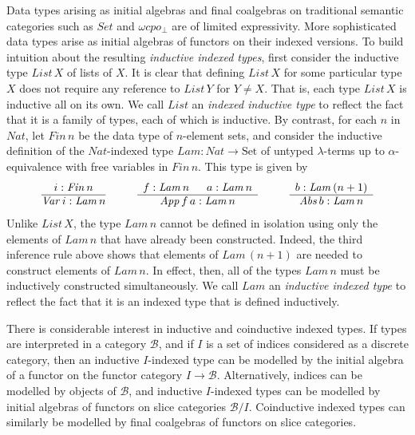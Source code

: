 \documentclass{LMCS}
\makeatletter
\newcommand{\ra}{\rightarrow}
\newcommand{\Set}{\mbox{Set}}
\newcommand{\proofrule}[2]{\ensuremath{
  \begin{array}[t]{@{}c@{}}
    \begin{array}[t]{lllll} 
      #1
    \end{array}\\
  \hline 
     #2
  \end{array}}}
\newcommand\B{{\mathcal B}}
\newcommand\Lam{\mathit{Lam}}
\newcommand\Fin{\mathit{Fin}}
\newcommand\Nat{\mathit{Nat}}
\theoremstyle{plain}
\theoremstyle{remark}
\theoremstyle{definition}
\makeatother
\begin{document}
Data types arising as initial algebras and final coalgebras on
traditional semantic categories such as $Set$ and $\omega cpo_{\bot}$
are of limited expressivity. More sophisticated data types arise as
initial algebras of functors on their indexed versions. To build
intuition about the resulting {\em inductive indexed types}, first
consider the inductive type $\mathit{List}\,X$ of lists of $X$. It is
clear that defining $\mathit{List}\, X$ for some particular type $X$
does not require any reference to $\mathit{List}\, Y$ for $Y\neq
X$. That is, each type $\mathit{List}\, X$ is inductive all on its
own. We call $\mathit{List}$ an {\em indexed inductive type} to
reflect the fact that it is a family of types, each of which is
inductive. By contrast, for each $n$ in $\mathit{Nat}$, let $\Fin\,n$
be the data type of $n$-element sets, and consider the inductive
definition of the $\Nat$-indexed type $\Lam : \Nat \ra \Set$ of
untyped $\lambda$-terms up to $\alpha$-equivalence with free variables
in $\Fin \,n$. This type is given by
\[\proofrule{i : \Fin \,n}
             {\mathit{Var} \, i : \Lam\, n }
\hspace{1cm}
\proofrule{ f : \Lam \,n &\;\; a : \Lam\, n}
          {\mathit{App} \, f \, a : \Lam\, n}
\hspace{1cm}
\proofrule{ b : \Lam \,(n+1) }
          {\mathit{Abs} \, b : \Lam\, n }
\]
Unlike $\mathit{List}\, X$, the type $\Lam \,n$ cannot be defined in
isolation using only the elements of $\Lam \,n$ that have already been
constructed. Indeed, the third inference rule above shows that
elements of $\Lam\, (n+1)$ are needed to construct elements of $\Lam
\,n$. In effect, then, all of the types $\Lam\,n$ must be inductively
constructed simultaneously. We call $\Lam$ an {\em inductive indexed
  type} to reflect the fact that it is an indexed type that is defined
inductively.

There is considerable interest in inductive and coinductive indexed
types. If types are interpreted in a category $\B$, and if $I$ is a
set of indices considered as a discrete category, then an inductive
$I$-indexed type can be modelled by the initial algebra of a functor
on the functor category $I \ra \B$. Alternatively, indices can be
modelled by objects of $\B$, and inductive $I$-indexed types can be
modelled by initial algebras of functors on slice categories
$\B/I$. Coinductive indexed types can similarly be modelled by final
coalgebras of functors on slice categories.
\end{document}
